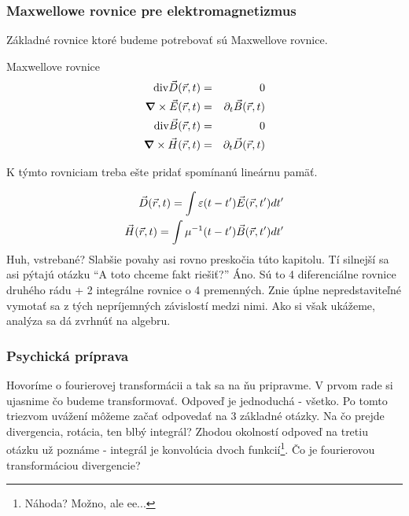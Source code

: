 \subsubsection{Maxwellowe rovnice pre elektromagnetizmus}


Základné rovnice ktoré budeme potrebovať sú Maxwellove
rovnice.

\def\rt{{(\vektor{r},t)}}
\def\kw{{(\vektor{k},\omega)}}

\begin{veta} Maxwellove rovnice
\begin{eqnarray}
  \div{\vektor{D}\rt} & = & 0 \\
  \curl{\vektor{E}\rt} & = & \partial_t \vektor{B} \rt \\
  \div{\vektor{B}\rt} & = & 0 \\
  \curl{\vektor{H}\rt} & = & \partial_t \vektor{D} \rt
\end{eqnarray}
\end{veta}

K týmto rovniciam treba ešte pridať spomínanú lineárnu pamäť.

\begin{eqnarray}
  \vektor{D}\rt = \int \eps(t-t') \vektor{E}(\vektor{r},t') dt' \\
  \vektor{H}\rt = \int \mu^{-1}(t-t') \vektor{B}(\vektor{r},t') dt'
\end{eqnarray}
Huh, vstrebané? Slabšie povahy asi rovno preskočia túto kapitolu. Tí
silnejší sa asi pýtajú otázku ``A toto chceme fakt riešiť?'' Áno.
Sú to 4 diferenciálne rovnice druhého rádu + 2 integrálne rovnice o 4
premenných. Znie úplne nepredstaviteľné vymotať sa z tých nepríjemných
závislostí medzi nimi. Ako si však ukážeme, analýza sa dá zvrhnúť na
algebru.

\subsubsection{Psychická príprava}
Hovoríme o fourierovej transformácii a tak sa na ňu pripravme. V prvom
rade si ujasnime čo budeme transformovať. Odpoveď je jednoduchá -
všetko. Po tomto triezvom uvážení môžeme začať odpovedať na 3 základné
otázky. Na čo prejde divergencia, rotácia, ten blbý integrál? Zhodou
okolností odpoveď na tretiu otázku už poznáme - integrál je konvolúcia
dvoch funkcií\footnote{Náhoda? Možno, ale ee...}. Čo je fourierovou
transformáciou divergencie?



